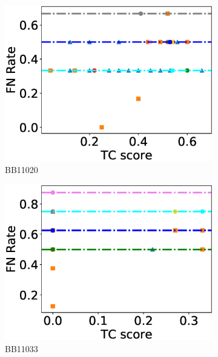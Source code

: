 \begin{figure}[!htbp]
\begin{adjustwidth}{-1cm}{-1cm}
\begin{subfigure}{0.26\textwidth}
			\includegraphics[width=\columnwidth]{Figure/summary/precomputedInit/Balibase/BB11020_fnrate_vs_tc_2}
			\caption{BB11020}
\end{subfigure}
		\begin{subfigure}{0.26\textwidth}
			\includegraphics[width=\columnwidth]{Figure/summary/precomputedInit/Balibase/BB11033_fnrate_vs_tc_2}
			\caption{BB11033}
\end{subfigure}    
		\begin{subfigure}{0.26\textwidth}

\end{subfigure}
\end{adjustwidth}
\end{figure}
